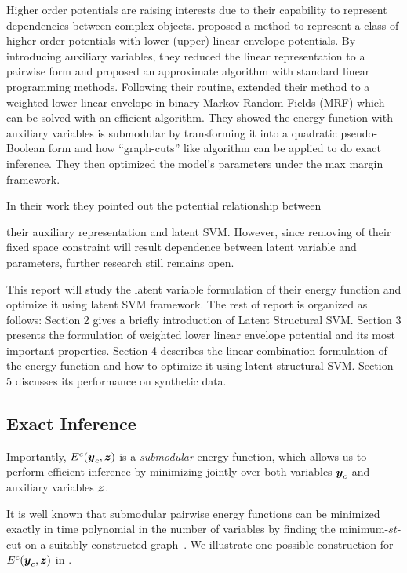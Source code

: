 \documentclass[twoside,doublespace,onecolumn,11pt,a4paper]{book}
\renewcommand{\citename}{\citet}
\renewcommand{\cite}{\citep}
\begin{document}
Higher order potentials are raising interests due to their
capability to represent dependencies between complex objects.
\citename{kohli2009robust} proposed a method to represent a class
of higher order potentials with lower (upper) linear envelope
potentials. By introducing auxiliary variables, they reduced the
linear representation to a pairwise form and proposed an
approximate algorithm with standard linear programming methods.
Following their routine, \citename{gouldlearning} extended their
method to a weighted lower linear envelope in binary Markov
Random Fields (MRF) which can be solved with an efficient
algorithm. They showed the energy function with auxiliary
variables is submodular by transforming it into a quadratic
pseudo-Boolean form and how “graph-cuts” like algorithm can be
applied to do exact inference. They then optimized the model’s
parameters under the max margin
framework\cite{tsochantaridis2005large}.

In their work they pointed out the potential relationship between

their auxiliary representation and latent
SVM\cite{yu2009learning}. However, since removing of their fixed
space constraint will result dependence between latent variable
and parameters, further research still remains open.

This report will study the latent variable formulation of their
energy function and optimize it using latent SVM framework. The
rest of report is organized as follows: Section 2 gives a briefly
introduction of Latent Structural SVM. Section 3 presents the
formulation of weighted lower linear envelope potential and its
most important properties. Section 4 describes the linear
combination formulation of the energy function and how to
optimize it using latent structural SVM. Section 5 discusses its
performance on synthetic data.


\subsection{Exact Inference}
\label{sec:exact_inference}

Importantly, $E^c({\boldsymbol{y}}_c, {\boldsymbol{z}})$ is a \emph{submodular} energy
function, which allows us to perform efficient inference by
minimizing jointly over both variables ${\boldsymbol{y}}_c$ and auxiliary
variables ${\boldsymbol{z}}$.

It is well known that submodular pairwise energy functions can be
minimized exactly in time polynomial in the number of variables
by finding the minimum-$st$-cut on a suitably constructed
graph~\cite{Kolmogorov:PAMI04, Hammer:1965}. We illustrate one
possible construction for $E^c({\boldsymbol{y}}_c, {\boldsymbol{z}})$ in
.
\end{document}
